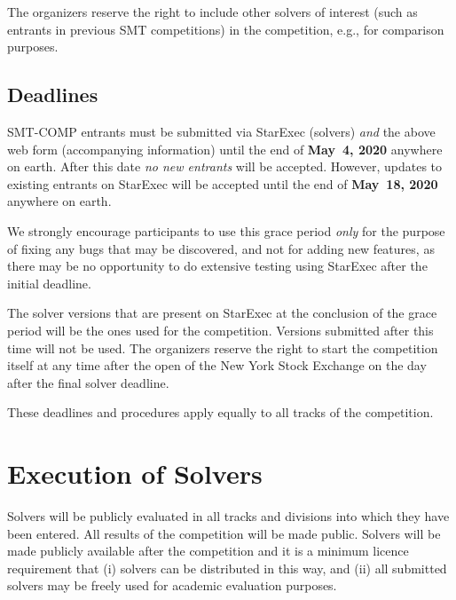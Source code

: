 \documentclass[12pt]{article}
\begin{document}
%
The organizers reserve the right to include other solvers of interest
(such as entrants in previous SMT competitions) in the competition,
e.g., for comparison purposes.

%


\subsection*{Deadlines}

SMT-COMP entrants must be submitted via StarExec (solvers) \emph{and}
the above web form (accompanying information) until the end of
{\bf May~4, 2020} anywhere on earth.
After this date \emph{no new entrants} will be accepted.
However, updates to existing entrants on StarExec
will be accepted until the end of {\bf May~18, 2020} anywhere on earth.

We strongly encourage participants to use this grace period
\emph{only} for the purpose of fixing any bugs that may be discovered,
and not for adding new features, as there may be no opportunity to do
extensive testing using StarExec after the initial deadline.

The solver versions that are present on StarExec at the conclusion of
the grace period will be the ones used for the competition.  Versions
submitted after this time will not be used.  The organizers reserve
the right to start the competition itself at any time after the open
of the New York Stock Exchange on the day after the final solver
deadline.

These deadlines and procedures apply equally to all tracks of the
competition.




\section{Execution of Solvers}

Solvers will be publicly evaluated in all tracks and divisions into
which they have been entered.  All results of the competition will be
made public. Solvers will be made publicly available after the competition and it is a minimum licence requirement that (i) solvers can be distributed in this way, and (ii) all submitted solvers may be freely used for academic evaluation purposes.
\end{document}
